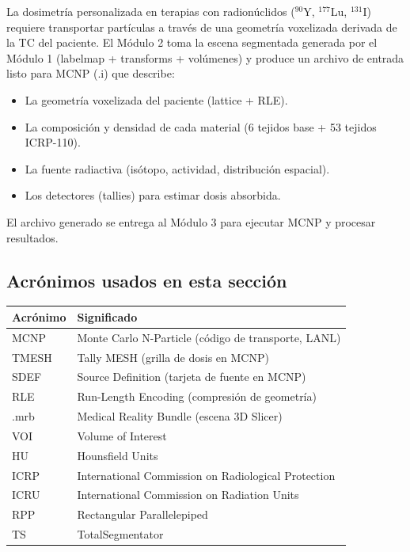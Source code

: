 \documentclass[12pt,a4paper]{article}
\begin{document}
La dosimetría personalizada en terapias con radionúclidos ($^{90}$Y, $^{177}$Lu, $^{131}$I) requiere transportar partículas a través de una geometría voxelizada derivada de la TC del paciente. El Módulo 2 toma la escena segmentada generada por el Módulo 1 (labelmap + transforms + volúmenes) y produce un archivo de entrada listo para MCNP (.i) que describe:

\begin{itemize}
    \item La geometría voxelizada del paciente (lattice + RLE).
    \item La composición y densidad de cada material (6 tejidos base + 53 tejidos ICRP-110).
    \item La fuente radiactiva (isótopo, actividad, distribución espacial).
    \item Los detectores (tallies) para estimar dosis absorbida.
\end{itemize}

El archivo generado se entrega al Módulo 3 para ejecutar MCNP y procesar resultados.

\vspace{0.8em}
\noindent
\subsection*{Acrónimos usados en esta sección}
\begin{tabular}{ll}
\toprule
\textbf{Acrónimo} & \textbf{Significado} \\
\midrule
MCNP & Monte Carlo N-Particle (código de transporte, LANL) \\
TMESH & Tally MESH (grilla de dosis en MCNP) \\
SDEF & Source Definition (tarjeta de fuente en MCNP) \\
RLE & Run-Length Encoding (compresión de geometría) \\
.mrb & Medical Reality Bundle (escena 3D Slicer) \\
VOI & Volume of Interest \\
HU & Hounsfield Units \\
ICRP & International Commission on Radiological Protection \\
ICRU & International Commission on Radiation Units \\
RPP & Rectangular Parallelepiped \\
TS & TotalSegmentator \\
\bottomrule
\end{tabular}
\end{document}
